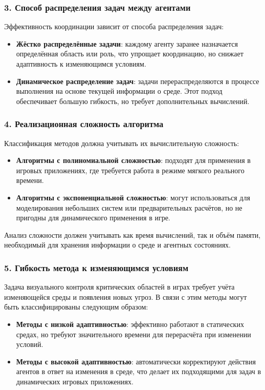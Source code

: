 \subsubsection*{3. Способ распределения задач между агентами}
Эффективность координации зависит от способа распределения задач:
\begin{itemize}
	\item \textbf{Жёстко распределённые задачи}: каждому агенту заранее назначается определённая область или роль, что упрощает координацию, но снижает адаптивность к изменяющимся условиям.
	\item \textbf{Динамическое распределение задач}: задачи перераспределяются в процессе выполнения на основе текущей информации о среде.
	Этот подход обеспечивает большую гибкость, но требует дополнительных вычислений.
\end{itemize}

\subsubsection*{4. Реализационная сложность алгоритма}
Классификация методов должна учитывать их вычислительную сложность:
\begin{itemize}
	\item \textbf{Алгоритмы с полиномиальной сложностью}: подходят для применения в игровых приложениях, где требуется работа в режиме мягкого реального времени.  
	\item \textbf{Алгоритмы с экспоненциальной сложностью}: могут использоваться для моделирования небольших систем или предварительных расчётов, но не пригодны для динамического применения в игре.
\end{itemize}
Анализ сложности должен учитывать как время вычислений, так и объём памяти, необходимый для хранения информации о среде и агентных состояниях.

\subsubsection*{5. Гибкость метода к изменяющимся условиям}
Задача визуального контроля критических областей в играх требует учёта изменяющейся среды и появления новых угроз.
В связи с этим методы могут быть классифицированы следующим образом:
\begin{itemize}
	\item \textbf{Методы с низкой адаптивностью}: эффективно работают в статических средах, но требуют значительного времени для перерасчёта при изменении условий.  
	\item \textbf{Методы с высокой адаптивностью}: автоматически корректируют действия агентов в ответ на изменения в среде, что делает их подходящими для задач в динамических игровых приложениях.
\end{itemize}

